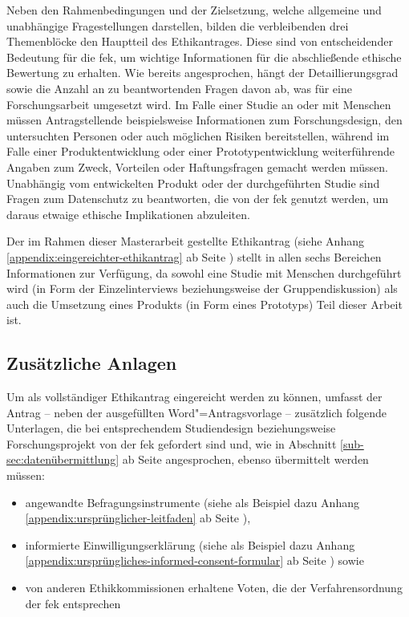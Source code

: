 \documentclass[a4paper,12pt,twoside]{scrreprt}
\begin{document}
\medskip

Neben den Rahmenbedingungen und der Zielsetzung, welche allgemeine und unabhängige Fragestellungen darstellen, bilden die verbleibenden drei Themenblöcke den Hauptteil des Ethikantrages. Diese sind von entscheidender Bedeutung für die \ac{fek}, um wichtige Informationen für die abschließende ethische Bewertung zu erhalten. Wie bereits angesprochen, hängt der Detaillierungsgrad sowie die Anzahl an zu beantwortenden Fragen davon ab, was für eine Forschungsarbeit umgesetzt wird. Im Falle einer Studie an oder mit Menschen müssen Antragstellende beispielsweise Informationen zum Forschungsdesign, den untersuchten Personen oder auch möglichen Risiken bereitstellen, während im Falle einer Produktentwicklung oder einer Prototypentwicklung weiterführende Angaben zum Zweck, Vorteilen oder Haftungsfragen gemacht werden müssen. Unabhängig vom entwickelten Produkt oder der durchgeführten Studie sind Fragen zum Datenschutz zu beantworten, die von der \ac{fek} genutzt werden, um daraus etwaige ethische Implikationen abzuleiten.

Der im Rahmen dieser Masterarbeit gestellte Ethikantrag (siehe Anhang \ref{appendix:eingereichter-ethikantrag} ab Seite \pageref{appendix:eingereichter-ethikantrag}) stellt in allen sechs Bereichen Informationen zur Verfügung, da sowohl eine Studie mit Menschen durchgeführt wird (in Form der Einzelinterviews beziehungsweise der Gruppendiskussion) als auch die Umsetzung eines Produkts (in Form eines Prototyps) Teil dieser Arbeit ist.

\subsection{Zusätzliche Anlagen}
\label{sub-sec:inhaltlicher-aufbau-zusätzliche-anlagen}

Um als vollständiger Ethikantrag eingereicht werden zu können, umfasst der Antrag -- neben der ausgefüllten Word"=Antragsvorlage -- zusätzlich folgende Unterlagen, die bei entsprechendem Studiendesign beziehungsweise Forschungsprojekt von der \ac{fek} gefordert sind \cite{fachhochschule_vorarlberg_gmbh_forschungsethik-kommission_2021} und, wie in Abschnitt \ref{sub-sec:datenübermittlung} ab Seite \pageref{sub-sec:datenübermittlung} angesprochen, ebenso übermittelt werden müssen:
\begin{itemize}
    \item angewandte Befragungsinstrumente (siehe als Beispiel dazu Anhang \ref{appendix:ursprünglicher-leitfaden} ab Seite \pageref{appendix:ursprünglicher-leitfaden}),
    \item informierte Einwilligungserklärung (siehe als Beispiel dazu Anhang \ref{appendix:ursprüngliches-informed-consent-formular} ab Seite \pageref{appendix:ursprüngliches-informed-consent-formular}) sowie
    \item von anderen Ethikkommissionen erhaltene Voten, die der Verfahrensordnung der \ac{fek} entsprechen
\end{itemize}
\end{document}
